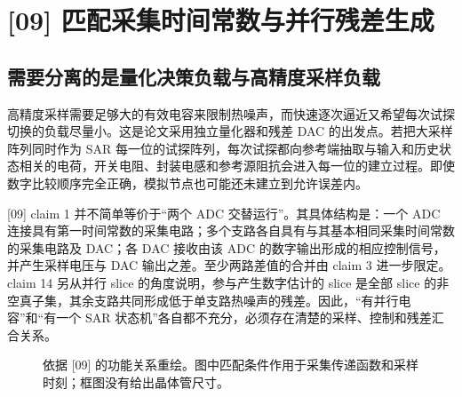 \section{[09] 匹配采集时间常数与并行残差生成}
\subsection{需要分离的是量化决策负载与高精度采样负载}
高精度采样需要足够大的有效电容来限制热噪声，而快速逐次逼近又希望每次试探切换的负载尽量小。这是论文采用独立量化器和残差 DAC 的出发点。若把大采样阵列同时作为 SAR 每一位的试探阵列，每次试探都向参考端抽取与输入和历史状态相关的电荷，开关电阻、封装电感和参考源阻抗会进入每一位的建立过程。即使数字比较顺序完全正确，模拟节点也可能还未建立到允许误差内。

[09] claim 1 并不简单等价于“两个 ADC 交替运行”。其具体结构是：一个 ADC 连接具有第一时间常数的采集电路；多个支路各自具有与其基本相同采集时间常数的采集电路及 DAC；各 DAC 接收由该 ADC 的数字输出形成的相应控制信号，并产生采样电压与 DAC 输出之差。至少两路差值的合并由 claim 3 进一步限定。claim 14 另从并行 slice 的角度说明，参与产生数字估计的 slice 是全部 slice 的非空真子集，其余支路共同形成低于单支路热噪声的残差。因此，“有并行电容”和“有一个 SAR 状态机”各自都不充分，必须存在清楚的采样、控制和残差汇合关系。

\begin{figure}[htbp]\centering
{}
\caption{依据 [09] 的功能关系重绘。图中匹配条件作用于采集传递函数和采样时刻；框图没有给出晶体管尺寸。}
\end{figure}

